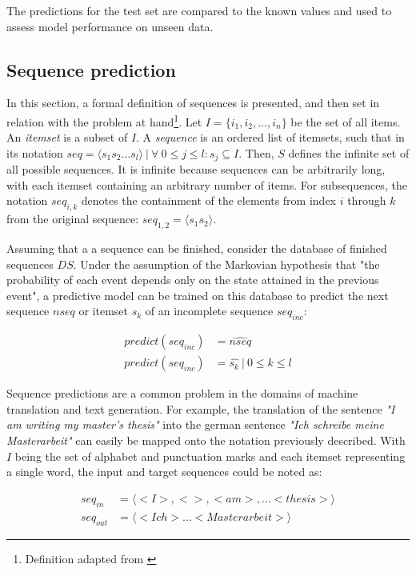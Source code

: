 The predictions for the test set are compared to the known values and used to assess model performance on unseen data.

\subsection{Sequence prediction}
In this section, a formal definition of sequences is presented, and then set in relation with the problem at hand\footnote{Definition adapted from \cite{pei2001prefixspan}}.  Let $I = \{i_1, i_2, ..., i_n\}$ be the set of all items. An \textit{itemset} is a subset of $I$. A \textit{sequence} is an ordered list of itemsets, such that in its notation $seq = \langle s_1s_2...s_l \rangle\ |\ \forall\ 0 \leq j \leq l: s_j \subseteq I$. Then, $S$ defines the infinite set of all possible sequences. It is infinite because sequences can be arbitrarily long, with each itemset containing an arbitrary number of items. For  subsequences, the notation $seq_{i,k}$ denotes the containment of the elements from index $i$ through $k$ from the original sequence: $seq_{1,2} = \langle s_1s_2 \rangle$.

Assuming that a a sequence can be finished, consider the database of finished sequences $DS$. Under the assumption of the Markovian hypothesis that "the probability of each event depends only on the state attained in the previous event"\cite{gagniuc2017markov}, a predictive model can be trained on this database to predict the next sequence $nseq$ or itemset $s_k$ of an incomplete sequence $seq_{inc}$:

\begin{equation}
\begin{split}
    predict(seq_{inc}) &= \widehat{nseq}\\
    predict(seq_{inc}) &= \hat{s_k}\ |\ 0 \leq k \leq l
\end{split}
\label{eq:prediction-from-sequence}
\end{equation}

Sequence predictions are a common problem in the domains of machine translation and text generation. For example, the translation of the sentence \textit{"I am writing my master's thesis"} into the german sentence \textit{"Ich schreibe meine Masterarbeit"} can easily be mapped onto the notation previously described. With $I$ being the set of alphabet and punctuation marks and each itemset representing a single word, the input and target sequences could be noted as:

\begin{equation*}
\begin{split}
seq_{in} &= \langle<I>, < >, <am>, ... <thesis>\rangle\\
seq_{out} &= \langle<Ich> ... <Masterarbeit>\rangle
\end{split}
\end{equation*}

